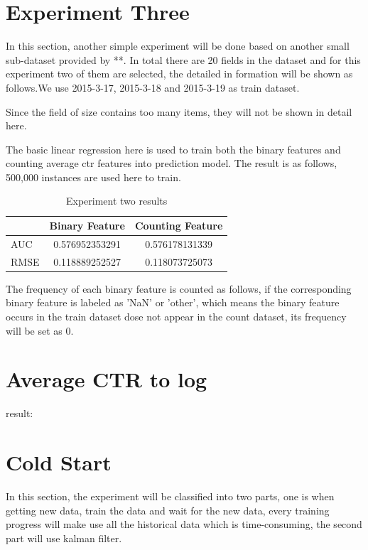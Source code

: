 \documentclass{article}
\begin{document}
\section{Experiment Three}

In this section, another simple experiment will be done based on another small sub-dataset provided by **. In total there are 20 fields in the dataset and for this experiment two of them are selected, the detailed in formation will be shown as follows.We use 2015-3-17, 2015-3-18 and 2015-3-19 as train dataset. \vspace{3mm}

Since the field of size contains too many items, they will not be shown in detail here.

 The basic linear regression here is used to train both the binary features and counting average ctr features into prediction model. The result is as follows, 500,000 instances are used here to train.

\begin{table}[h]
\setlength{\parindent}{17ex}
\begin{tabular}{l | c | c }
  & Binary Feature & Counting Feature\\
\hline \hline
AUC & 0.576952353291
 & 0.576178131339 \\
 
RMSE & 0.118889252527 & 0.118073725073


\end{tabular}
\caption{Experiment two results}
\label{tab:tri}
\end{table}
The frequency of each binary feature is counted as follows, if the corresponding binary feature is labeled as 'NaN' or 'other', which means the binary feature occurs in the train dataset dose not appear in the count dataset, its frequency will be set as 0. \vspace{3mm}


\section{Average CTR to log}
result: 


\section{Cold Start}

In this section, the experiment will be classified into two parts, one is when getting new data, train the data and wait for the new data, every training progress will make use all the historical data which is time-consuming, the second part will use kalman filter.
\end{document}
